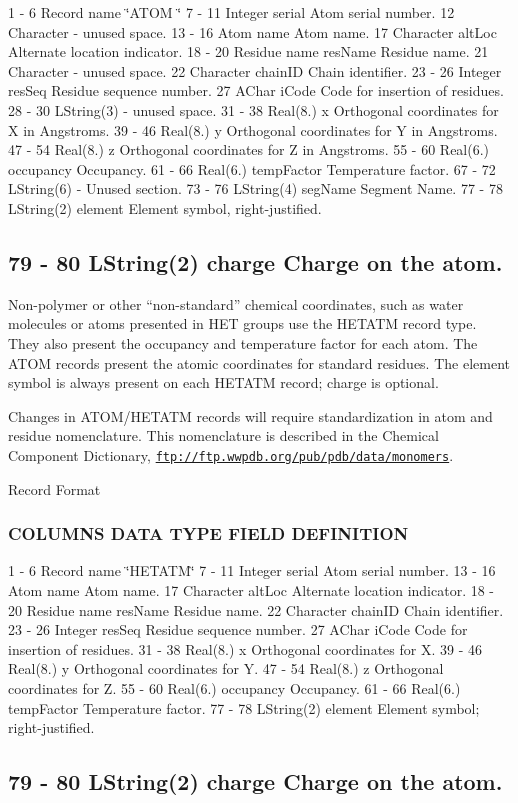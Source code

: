 1 -\/ 6 Record name \char`\"{}\+A\+T\+O\+M  \char`\"{} 7 -\/ 11 Integer serial Atom serial number. 12 Character -\/ unused space. 13 -\/ 16 Atom name Atom name. 17 Character alt\+Loc Alternate location indicator. 18 -\/ 20 Residue name res\+Name Residue name. 21 Character -\/ unused space. 22 Character chain\+I\+D Chain identifier. 23 -\/ 26 Integer res\+Seq Residue sequence number. 27 A\+Char i\+Code Code for insertion of residues. 28 -\/ 30 L\+String(3) -\/ unused space. 31 -\/ 38 Real(8.) x Orthogonal coordinates for X in Angstroms. 39 -\/ 46 Real(8.) y Orthogonal coordinates for Y in Angstroms. 47 -\/ 54 Real(8.) z Orthogonal coordinates for Z in Angstroms. 55 -\/ 60 Real(6.) occupancy Occupancy. 61 -\/ 66 Real(6.) temp\+Factor Temperature factor. 67 -\/ 72 L\+String(6) -\/ Unused section. 73 -\/ 76 L\+String(4) seg\+Name Segment Name. 77 -\/ 78 L\+String(2) element Element symbol, right-\/justified. \subsection*{79 -\/ 80 L\+String(2) charge Charge on the atom. }

Non-\/polymer or other “non-\/standard” chemical coordinates, such as water molecules or atoms presented in H\+E\+T groups use the H\+E\+T\+A\+T\+M record type. They also present the occupancy and temperature factor for each atom. The A\+T\+O\+M records present the atomic coordinates for standard residues. The element symbol is always present on each H\+E\+T\+A\+T\+M record; charge is optional.

Changes in A\+T\+O\+M/\+H\+E\+T\+A\+T\+M records will require standardization in atom and residue nomenclature. This nomenclature is described in the Chemical Component Dictionary, \href{ftp://ftp.wwpdb.org/pub/pdb/data/monomers}{\tt ftp\+://ftp.\+wwpdb.\+org/pub/pdb/data/monomers}.

Record Format

\subsubsection*{C\+O\+L\+U\+M\+N\+S D\+A\+T\+A T\+Y\+P\+E F\+I\+E\+L\+D D\+E\+F\+I\+N\+I\+T\+I\+O\+N }

1 -\/ 6 Record name \char`\"{}\+H\+E\+T\+A\+T\+M\char`\"{} 7 -\/ 11 Integer serial Atom serial number. 13 -\/ 16 Atom name Atom name. 17 Character alt\+Loc Alternate location indicator. 18 -\/ 20 Residue name res\+Name Residue name. 22 Character chain\+I\+D Chain identifier. 23 -\/ 26 Integer res\+Seq Residue sequence number. 27 A\+Char i\+Code Code for insertion of residues. 31 -\/ 38 Real(8.) x Orthogonal coordinates for X. 39 -\/ 46 Real(8.) y Orthogonal coordinates for Y. 47 -\/ 54 Real(8.) z Orthogonal coordinates for Z. 55 -\/ 60 Real(6.) occupancy Occupancy. 61 -\/ 66 Real(6.) temp\+Factor Temperature factor. 77 -\/ 78 L\+String(2) element Element symbol; right-\/justified. \subsection*{79 -\/ 80 L\+String(2) charge Charge on the atom. }

